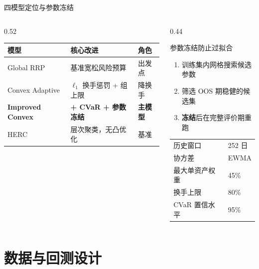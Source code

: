 \documentclass[aspectratio=169,11pt]{beamer}
\begin{document}
\begin{frame}{四模型定位与参数冻结}
  \begin{columns}[T]
    \begin{column}{0.52\textwidth}
      \renewcommand{\arraystretch}{1.3}
      \footnotesize
      \begin{tabular}{@{}l>{\raggedright\arraybackslash}p{3.6cm}l@{}}
        \toprule
        模型 & 核心改进 & 角色 \\
        \midrule
        Global RRP       & 基准宽松风险预算 & 出发点 \\
        Convex Adaptive  & $\ell_1$ 换手惩罚 + 组上限 & 降换手 \\
        \textbf{Improved Convex} & \textbf{+ CVaR + 参数冻结} & \textbf{主模型} \\
        HERC             & 层次聚类，无凸优化 & 基准 \\
        \bottomrule
      \end{tabular}
    \end{column}
    \begin{column}{0.44\textwidth}
      \begin{block}{参数冻结防止过拟合}
        \footnotesize
        \begin{enumerate}
          \item 训练集内网格搜索候选参数
          \item 筛选 OOS 期稳健的候选集
          \item \textbf{冻结}后在完整评价期重跑
        \end{enumerate}
      \end{block}
      \vspace{0.3em}
      \footnotesize
      \begin{tabular}{@{}ll@{}}
        历史窗口 & 252 日 \\
        协方差 & EWMA \\
        最大单资产权重 & 45\% \\
        换手上限 & 80\% \\
        CVaR 置信水平 & 95\% \\
      \end{tabular}
    \end{column}
  \end{columns}
\end{frame}

\section{数据与回测设计}
\end{document}
